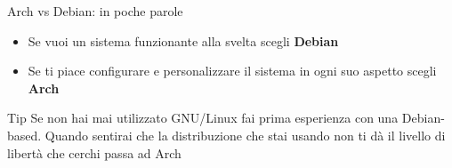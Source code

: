 \begin{frame}{Arch vs Debian: in poche parole}
    \begin{itemize}
        \item Se vuoi un sistema funzionante alla svelta scegli \textbf{Debian}
        \item Se ti piace configurare e personalizzare il sistema in ogni suo aspetto scegli \textbf{Arch}
    \end{itemize}

    
    \begin{alertblock}{Tip}
        Se non hai mai utilizzato GNU/Linux fai prima esperienza con una Debian-based. Quando sentirai
        che la distribuzione che stai usando non ti dà il livello di libertà che cerchi passa ad Arch
    \end{alertblock}
\end{frame}

